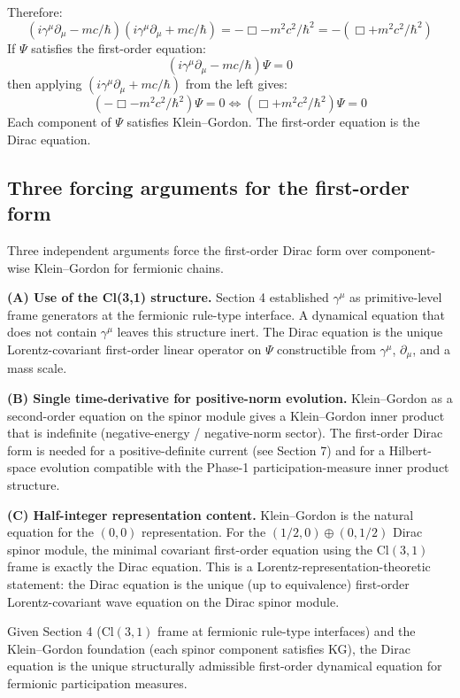 \documentclass[11pt,a4paper]{article}
\begin{document}
Therefore:
\[
(i\gamma^\mu\partial_\mu - mc/\hbar)(i\gamma^\mu\partial_\mu + mc/\hbar) = -\Box - m^{2}c^{2}/\hbar^{2} = -(\Box + m^{2}c^{2}/\hbar^{2})
\]
If $\Psi$ satisfies the first-order equation:
\[
(i\gamma^\mu\partial_\mu - mc/\hbar)\Psi = 0
\]
then applying $(i\gamma^\mu\partial_\mu + mc/\hbar)$ from the left gives:
\[
(-\Box - m^{2}c^{2}/\hbar^{2})\Psi = 0 \iff (\Box + m^{2}c^{2}/\hbar^{2})\Psi = 0
\]
Each component of $\Psi$ satisfies Klein--Gordon. The first-order equation is the Dirac equation.

\subsection{Three forcing arguments for the first-order form}

Three independent arguments force the first-order Dirac form over component-wise Klein--Gordon for fermionic chains.

\textbf{(A) Use of the Cl(3,1) structure.} Section 4 established $\gamma^\mu$ as primitive-level frame generators at the fermionic rule-type interface. A dynamical equation that does not contain $\gamma^\mu$ leaves this structure inert. The Dirac equation is the unique Lorentz-covariant first-order linear operator on $\Psi$ constructible from $\gamma^\mu$, $\partial_\mu$, and a mass scale.

\textbf{(B) Single time-derivative for positive-norm evolution.} Klein--Gordon as a second-order equation on the spinor module gives a Klein--Gordon inner product that is indefinite (negative-energy / negative-norm sector). The first-order Dirac form is needed for a positive-definite current (see Section 7) and for a Hilbert-space evolution compatible with the Phase-1 participation-measure inner product structure.

\textbf{(C) Half-integer representation content.} Klein--Gordon is the natural equation for the $(0,0)$ representation. For the $(1/2, 0) \oplus (0, 1/2)$ Dirac spinor module, the minimal covariant first-order equation using the $\mathrm{Cl}(3,1)$ frame is exactly the Dirac equation. This is a Lorentz-representation-theoretic statement: the Dirac equation is the unique (up to equivalence) first-order Lorentz-covariant wave equation on the Dirac spinor module.

Given Section 4 ($\mathrm{Cl}(3,1)$ frame at fermionic rule-type interfaces) and the Klein--Gordon foundation (each spinor component satisfies KG), the Dirac equation is the unique structurally admissible first-order dynamical equation for fermionic participation measures.
\end{document}
